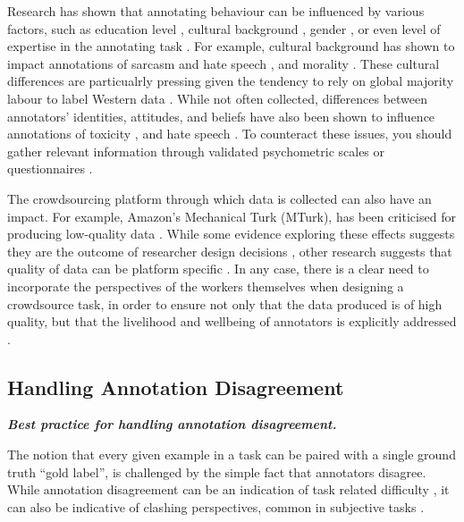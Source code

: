 Research has shown that annotating behaviour can be influenced by various factors, such as education level \citep{al_kuwatly_identifying_2020, fortuna_directions_2022}, cultural background \citep{smart_discipline_2024}, gender \citep{biester-etal-2022-analyzing, excell_towards_2021}, or even level of expertise in the annotating task \citep{talat_are_2016, lopez_long_interaction_2021}. For example, cultural background has shown to impact annotations of sarcasm and hate speech \citep{lee-etal-2024-exploring-cross}, and morality \citep{10.1145/3630106.3659021}. These cultural differences are particualrly pressing given the tendency to rely on global majority labour to label Western data \citep{smart_discipline_2024}. While not often collected, differences between annotators' identities, attitudes, and beliefs have also been shown to influence annotations of toxicity \citep{sap-etal-2022-annotators}, and hate speech \citep{feng-etal-2023-pretraining}. To counteract these issues, you should gather relevant information through validated psychometric scales or questionnaires \citep{abercrombie-etal-2024-revisiting, sap-etal-2022-annotators}. 

The crowdsourcing platform through which data is collected can also have an impact. For example, Amazon's Mechanical Turk (MTurk), has been criticised for producing low-quality data \citep{Chmielewski-Kucker-2020-MturkCrisis, fort_crowdsourcing_2014}. While some evidence exploring these effects suggests they are the outcome of researcher design decisions \citep{Allahbakhsh-etal-2013-QualityCrowdIssue, Daniel-etal-2018-QualityCrowdSurvey}, other research suggests that quality of data can be platform specific \citep{Chmielewski-Kucker-2020-MturkCrisis, eyal2021data, kennedy2020shape}. In any case, there is a clear need to incorporate the perspectives of the workers themselves when designing a crowdsource task, in order to ensure not only that the data produced is of high quality, but that the livelihood and wellbeing of annotators is explicitly addressed \citep{huang-etal-2023-incorporating}.

\subsection{Handling Annotation Disagreement}
\noindent\textbf{\textit{Best practice for handling annotation disagreement.}}
\newline 

The notion that every given example in a task can be paired with a single ground truth ``gold label''\citep{basile2020s}, is challenged by the simple fact that annotators disagree. While annotation disagreement can be an indication of task related difficulty \citep{talat_disembodied_2021}, it can also be indicative of clashing perspectives, common in subjective tasks \citep{uma2021learning, uma2022scaling}. 


